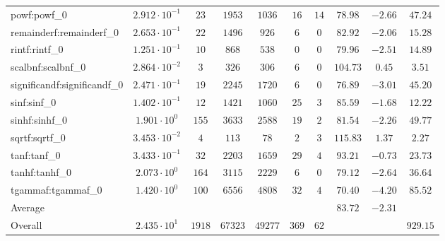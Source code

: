 \begin{tabular}{|l|c|c|c|c|c|c|c|c|c|}
powf:powf\_0                 & $ 2.912 \cdot 10^{-1} $ & $ 23     $ & $ 1953  $ & $ 1036  $ & $ 16  $ & $ 14 $ & $ 78.98       $ & $ -2.66   $ & $ 47.24   $ \\
remainderf:remainderf\_0     & $ 2.653 \cdot 10^{-1} $ & $ 22     $ & $ 1496  $ & $ 926   $ & $ 6   $ & $ 0  $ & $ 82.92       $ & $ -2.06   $ & $ 15.28   $ \\
rintf:rintf\_0               & $ 1.251 \cdot 10^{-1} $ & $ 10     $ & $ 868   $ & $ 538   $ & $ 0   $ & $ 0  $ & $ 79.96       $ & $ -2.51   $ & $ 14.89   $ \\
scalbnf:scalbnf\_0           & $ 2.864 \cdot 10^{-2} $ & $ 3      $ & $ 326   $ & $ 306   $ & $ 6   $ & $ 0  $ & $ 104.73      $ & $ 0.45    $ & $ 3.51    $ \\
significandf:significandf\_0 & $ 2.471 \cdot 10^{-1} $ & $ 19     $ & $ 2245  $ & $ 1720  $ & $ 6   $ & $ 0  $ & $ 76.89       $ & $ -3.01   $ & $ 45.20   $ \\
sinf:sinf\_0                 & $ 1.402 \cdot 10^{-1} $ & $ 12     $ & $ 1421  $ & $ 1060  $ & $ 25  $ & $ 3  $ & $ 85.59       $ & $ -1.68   $ & $ 12.22   $ \\
sinhf:sinhf\_0               & $ 1.901 \cdot 10^{0}  $ & $ 155    $ & $ 3633  $ & $ 2588  $ & $ 19  $ & $ 2  $ & $ 81.54       $ & $ -2.26   $ & $ 49.77   $ \\
sqrtf:sqrtf\_0               & $ 3.453 \cdot 10^{-2} $ & $ 4      $ & $ 113   $ & $ 78    $ & $ 2   $ & $ 3  $ & $ 115.83      $ & $ 1.37    $ & $ 2.27    $ \\
tanf:tanf\_0                 & $ 3.433 \cdot 10^{-1} $ & $ 32     $ & $ 2203  $ & $ 1659  $ & $ 29  $ & $ 4  $ & $ 93.21       $ & $ -0.73   $ & $ 23.73   $ \\
tanhf:tanhf\_0               & $ 2.073 \cdot 10^{0}  $ & $ 164    $ & $ 3115  $ & $ 2229  $ & $ 6   $ & $ 0  $ & $ 79.12       $ & $ -2.64   $ & $ 36.64   $ \\
tgammaf:tgammaf\_0           & $ 1.420 \cdot 10^{0}  $ & $ 100    $ & $ 6556  $ & $ 4808  $ & $ 32  $ & $ 4  $ & $ 70.40       $ & $ -4.20   $ & $ 85.52   $ \\
\hline
Average                      & $                     $ & $        $ & $       $ & $       $ & $     $ & $    $ & $ 83.72       $ & $ -2.31   $ & $         $ \\
\hline
Overall                      & $ 2.435 \cdot 10^{1}  $ & $ 1918   $ & $ 67323 $ & $ 49277 $ & $ 369 $ & $ 62 $ & $             $ & $         $ & $ 929.15  $ \\
\hline
\end{tabular}
